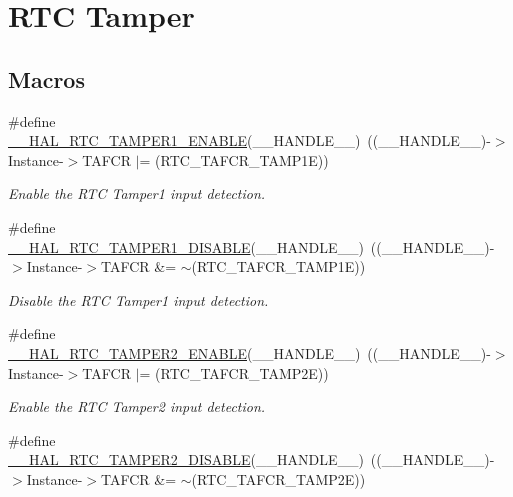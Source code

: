 \hypertarget{group___r_t_c_ex___tamper}{}\section{R\+TC Tamper}
\label{group___r_t_c_ex___tamper}
\subsection*{Macros}
\begin{DoxyCompactItemize}
\item 
\#define \hyperlink{group___r_t_c_ex___tamper_ga20e258063c402a28ebf29d11c1bdad66}{\+\_\+\+\_\+\+H\+A\+L\+\_\+\+R\+T\+C\+\_\+\+T\+A\+M\+P\+E\+R1\+\_\+\+E\+N\+A\+B\+LE}(\+\_\+\+\_\+\+H\+A\+N\+D\+L\+E\+\_\+\+\_\+)~((\+\_\+\+\_\+\+H\+A\+N\+D\+L\+E\+\_\+\+\_\+)-\/$>$Instance-\/$>$T\+A\+F\+CR $\vert$= (R\+T\+C\+\_\+\+T\+A\+F\+C\+R\+\_\+\+T\+A\+M\+P1E))
\begin{DoxyCompactList}\small\item\em Enable the R\+TC Tamper1 input detection. \end{DoxyCompactList}\item 
\#define \hyperlink{group___r_t_c_ex___tamper_ga3b2b39796ba4523adda000412ca646b3}{\+\_\+\+\_\+\+H\+A\+L\+\_\+\+R\+T\+C\+\_\+\+T\+A\+M\+P\+E\+R1\+\_\+\+D\+I\+S\+A\+B\+LE}(\+\_\+\+\_\+\+H\+A\+N\+D\+L\+E\+\_\+\+\_\+)~((\+\_\+\+\_\+\+H\+A\+N\+D\+L\+E\+\_\+\+\_\+)-\/$>$Instance-\/$>$T\+A\+F\+CR \&= $\sim$(R\+T\+C\+\_\+\+T\+A\+F\+C\+R\+\_\+\+T\+A\+M\+P1E))
\begin{DoxyCompactList}\small\item\em Disable the R\+TC Tamper1 input detection. \end{DoxyCompactList}\item 
\#define \hyperlink{group___r_t_c_ex___tamper_ga3c1eda9f2767d6b58e0b1412769cec76}{\+\_\+\+\_\+\+H\+A\+L\+\_\+\+R\+T\+C\+\_\+\+T\+A\+M\+P\+E\+R2\+\_\+\+E\+N\+A\+B\+LE}(\+\_\+\+\_\+\+H\+A\+N\+D\+L\+E\+\_\+\+\_\+)~((\+\_\+\+\_\+\+H\+A\+N\+D\+L\+E\+\_\+\+\_\+)-\/$>$Instance-\/$>$T\+A\+F\+CR $\vert$= (R\+T\+C\+\_\+\+T\+A\+F\+C\+R\+\_\+\+T\+A\+M\+P2E))
\begin{DoxyCompactList}\small\item\em Enable the R\+TC Tamper2 input detection. \end{DoxyCompactList}\item 
\#define \hyperlink{group___r_t_c_ex___tamper_ga13173b69e2845a23bce5bc612023a749}{\+\_\+\+\_\+\+H\+A\+L\+\_\+\+R\+T\+C\+\_\+\+T\+A\+M\+P\+E\+R2\+\_\+\+D\+I\+S\+A\+B\+LE}(\+\_\+\+\_\+\+H\+A\+N\+D\+L\+E\+\_\+\+\_\+)~((\+\_\+\+\_\+\+H\+A\+N\+D\+L\+E\+\_\+\+\_\+)-\/$>$Instance-\/$>$T\+A\+F\+CR \&= $\sim$(R\+T\+C\+\_\+\+T\+A\+F\+C\+R\+\_\+\+T\+A\+M\+P2E))

\end{DoxyCompactItemize}
